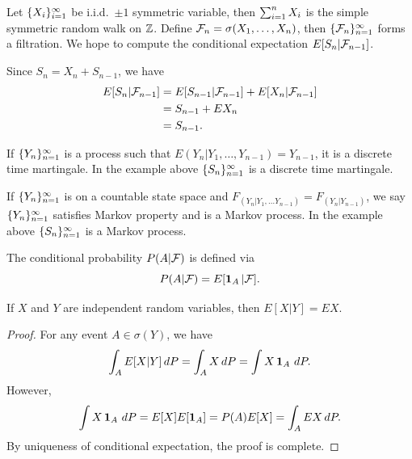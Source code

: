 \documentclass[a4paper]{article}
\begin{document}
\begin{eg}
  Let $\{ X_i \}_{i=1}^\infty$ be i.i.d.\ $\pm 1$ symmetric variable,
  then $\sum_{i=1}^n X_i$ is the simple symmetric random walk on $\mathbb{Z}$.
  Define $\mathcal{F}_n = \sigma (X_1, \dots, X_n)$, then
  $\{ \mathcal{F}_n \}_{n=1}^\infty$ forms a filtration. We hope to compute
  the conditional expectation $E [S_n | \mathcal{F}_{n - 1}]$.

  Since $S_n = X_n + S_{n - 1}$, we have
  \begin{align*}
    E[S_n | \mathcal{F}_{n - 1}]
     & = E[S_{n - 1} | \mathcal{F}_{n - 1}] + E[X_n | \mathcal{F}_{n - 1}] \\
     & = S_{n - 1} + E X_n                                     \\
     & = S_{n - 1}.
  \end{align*}

\end{eg}

\begin{remark}
  If $\{ Y_n \}_{n=1}^\infty$ is a process such that $E (Y_n | Y_1, \dots,
    Y_{n - 1}) = Y_{n - 1}$, it is a discrete time martingale.
  In the example above $\{ S_n \}_{n=1}^\infty$ is a discrete time martingale.
\end{remark}

\begin{remark}
  If $\{ Y_n \}_{n=1}^\infty$ is on a countable state space and
  $F_{(Y_n | Y_1, \dots Y_{n - 1})} = F_{(Y_n | Y_{n - 1})}$,
  we say $\{ Y_n \}_{n=1}^\infty$ satisfies Markov property and is a Markov process.
  In the example above $\{ S_n \}_{n=1}^\infty$ is a Markov process.
\end{remark}

\begin{defi}
  The conditional probability $P(A | \mathcal{F})$ is defined via
  \[
    P (A | \mathcal{F}) = E [\operatorname{\mathbf{1}}_A | \mathcal{F}].
  \]
\end{defi}

\begin{prop}
  If $X$ and $Y$ are independent random variables, then
  $E[X | Y] = E X$.
\end{prop}

\begin{proof}
  For any event $A \in \sigma (Y)$, we have
  \begin{align*}
    \int_A E[X | Y] \, d P = \int_A X \, d P
    = \int X \operatorname{\mathbf{1}}_A \, d P.
  \end{align*}
  However,
  \[
    \int X \operatorname{\mathbf{1}}_A \, d P = E[X] E[\operatorname{\mathbf{1}}_A] = P(A) E[X] = \int_A E X \, d P.
  \]
  By uniqueness of conditional expectation, the proof is complete.

\end{proof}
\end{document}
